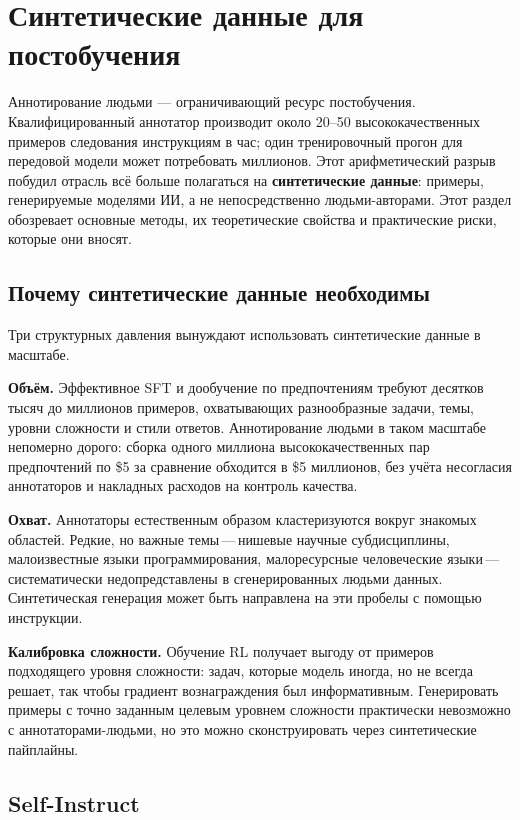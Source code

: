 \section{Синтетические данные для постобучения}
\label{sec:synthetic-data}

Аннотирование людьми --- ограничивающий ресурс постобучения. Квалифицированный аннотатор производит около 20--50 высококачественных примеров следования инструкциям в час; один тренировочный прогон для передовой модели может потребовать миллионов. Этот арифметический разрыв побудил отрасль всё больше полагаться на \textbf{синтетические данные}: примеры, генерируемые моделями ИИ, а не непосредственно людьми-авторами. Этот раздел обозревает основные методы, их теоретические свойства и практические риски, которые они вносят.

\subsection{Почему синтетические данные необходимы}

Три структурных давления вынуждают использовать синтетические данные в масштабе.

\textbf{Объём.} Эффективное SFT и дообучение по предпочтениям требуют десятков тысяч до миллионов примеров, охватывающих разнообразные задачи, темы, уровни сложности и стили ответов. Аннотирование людьми в таком масштабе непомерно дорого: сборка одного миллиона высококачественных пар предпочтений по \$5 за сравнение обходится в \$5 миллионов, без учёта несогласия аннотаторов и накладных расходов на контроль качества.

\textbf{Охват.} Аннотаторы естественным образом кластеризуются вокруг знакомых областей. Редкие, но важные темы\,---\,нишевые научные субдисциплины, малоизвестные языки программирования, малоресурсные человеческие языки\,---\,систематически недопредставлены в сгенерированных людьми данных. Синтетическая генерация может быть направлена на эти пробелы с помощью инструкции.

\textbf{Калибровка сложности.} Обучение RL получает выгоду от примеров подходящего уровня сложности: задач, которые модель иногда, но не всегда решает, так чтобы градиент вознаграждения был информативным. Генерировать примеры с точно заданным целевым уровнем сложности практически невозможно с аннотаторами-людьми, но это можно сконструировать через синтетические пайплайны.

\subsection{Self-Instruct}

